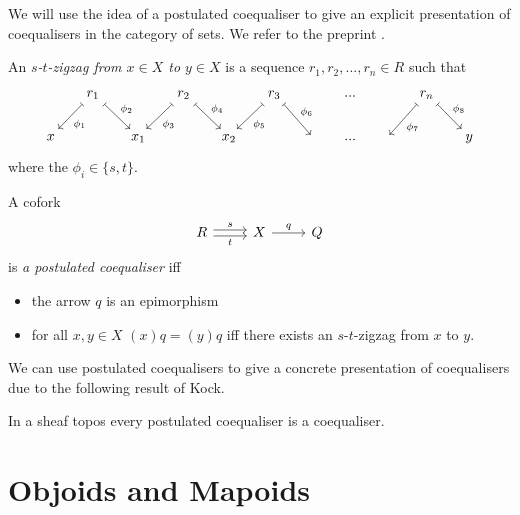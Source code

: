 \documentclass{article}
\begin{document}
We will use the idea of a postulated coequaliser to give an explicit presentation of coequalisers in the category of sets.
We refer to the preprint \cite{Kock89postulatedcolimits}.

\begin{definition}\label{def:zigzag}
  An \emph{$s$-$t$-zigzag from $x\in X$ to $y\in X$} is a sequence $r_1,r_2,...,r_n\in R$ such that
  \begin{equation*}
    \begin{tikzcd}[column sep=0.5cm]
      {} & r_1 \dlar[mapsto]{\phi_1} \drar[mapsto]{\phi_2} & {} & r_2 \dlar[mapsto]{\phi_3} \drar[mapsto]{\phi_4}& {} & r_3 \dlar[mapsto]{\phi_5}\drar[mapsto]{\phi_6} &{} &...& & r_n \dlar[mapsto]{\phi_7}\drar[mapsto]{\phi_8} &{} \\
      x & {} & x_1 & {} & x_2 & {} & {} & ...& {}  & {} & y
    \end{tikzcd}
  \end{equation*}
  where the $\phi_i\in\{s,t\}$.
\end{definition}  

\begin{definition}\label{def:postulated-coequaliser}
  A cofork
  \begin{equation*}
    \begin{tikzcd}
     R \rar[yshift=0.5ex]{s} \rar[yshift=-0.5ex][swap]{t} & X \rar{q} & Q
    \end{tikzcd}
  \end{equation*}
  is \emph{a postulated coequaliser} iff
  \begin{itemize}
  \item the arrow $q$ is an epimorphism
  \item for all $x,y\in X$ $(x)q=(y)q$ iff there exists an $s$-$t$-zigzag from $x$ to $y$.
  \end{itemize}
\end{definition}

We can use postulated coequalisers to give a concrete presentation of coequalisers due to the following result of Kock.

\begin{proposition}\label{prop:postulated-colimits-are-colimits}
  In a sheaf topos every postulated coequaliser is a coequaliser.
\end{proposition}

\section{Objoids and Mapoids}
\label{sec:objoids-mapoids}
\end{document}
